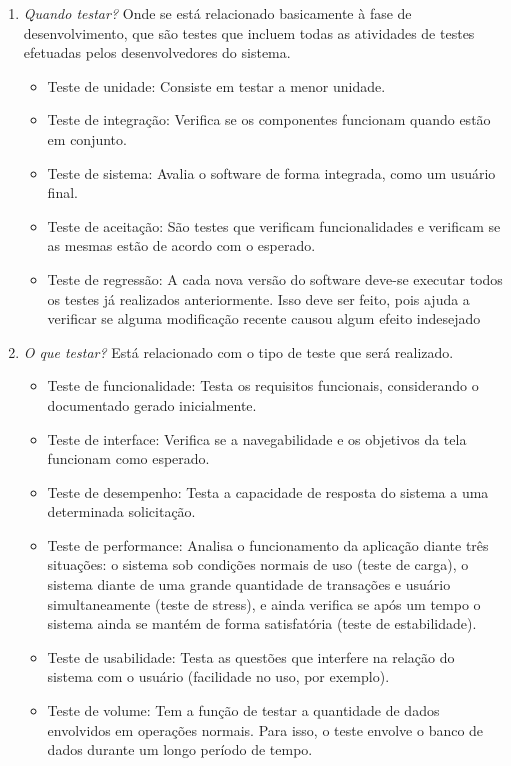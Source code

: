 \documentclass[runningheads]{llncs}
\begin{document}
\begin{enumerate}
    \item \textit{Quando testar?} Onde se está relacionado basicamente à fase de desenvolvimento, que são testes que incluem todas as atividades de testes efetuadas pelos desenvolvedores do sistema.
        \begin{itemize}
            \item {Teste de unidade}: Consiste em testar a menor unidade.
            \item {Teste de integração}: Verifica se os componentes funcionam quando estão em conjunto.
            \item {Teste de sistema}: Avalia o software de forma integrada, como um usuário final.
            \item {Teste de aceitação}: São testes que verificam funcionalidades e verificam se as mesmas estão de acordo com o esperado.
            \item {Teste de regressão}: A cada nova versão do software deve-se executar todos os testes já realizados anteriormente. Isso deve ser feito, pois ajuda a verificar se alguma modificação recente causou algum efeito indesejado
        \end{itemize}
    \item \textit{O que testar?} Está relacionado com o tipo de teste que será realizado.
        \begin{itemize}
            \item {Teste de funcionalidade}: Testa os requisitos funcionais, considerando o documentado gerado inicialmente.
            \item {Teste de interface}: Verifica se a navegabilidade e os objetivos da tela funcionam como esperado.
            \item {Teste de desempenho}: Testa a capacidade de resposta do sistema a uma determinada solicitação.
            \item {Teste de performance}: Analisa o funcionamento da aplicação diante três situações: o sistema sob condições normais de uso (teste de carga), o sistema diante de uma grande quantidade de transações e usuário simultaneamente (teste de stress), e ainda verifica se após um tempo o sistema ainda se mantém de forma satisfatória (teste de estabilidade).
            \item {Teste de usabilidade}: Testa as questões que interfere na relação do sistema com o usuário (facilidade no uso, por exemplo).
            \item {Teste de volume}: Tem a função de testar a quantidade de dados envolvidos em operações normais. Para isso, o teste envolve o banco de dados durante um longo período de tempo.

\end{itemize}
\end{enumerate}
\end{document}
